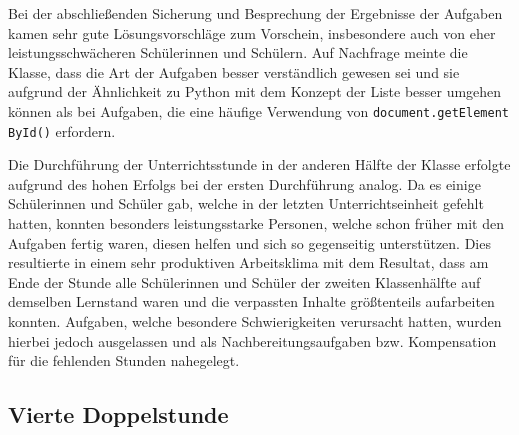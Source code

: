 Bei der abschließenden Sicherung und Besprechung der Ergebnisse der Aufgaben kamen sehr gute Lösungsvorschläge zum Vorschein, insbesondere auch von eher leistungsschwächeren Schülerinnen und Schülern.
Auf Nachfrage meinte die Klasse, dass die Art der Aufgaben besser verständlich gewesen sei und sie aufgrund der Ähnlichkeit zu Python mit dem Konzept der Liste besser umgehen können als bei Aufgaben, die eine häufige Verwendung von \texttt{document.getElement} \texttt{ById()} erfordern.

Die Durchführung der Unterrichtsstunde in der anderen Hälfte der Klasse erfolgte aufgrund des hohen Erfolgs bei der ersten Durchführung analog.
Da es einige Schülerinnen und Schüler gab, welche in der letzten Unterrichtseinheit gefehlt hatten, konnten besonders leistungsstarke Personen, welche schon früher mit den Aufgaben fertig waren, diesen helfen und sich so gegenseitig unterstützen.
Dies resultierte in einem sehr produktiven Arbeitsklima mit dem Resultat, dass am Ende der Stunde alle Schülerinnen und Schüler der zweiten Klassenhälfte auf demselben Lernstand waren und die verpassten Inhalte größtenteils aufarbeiten konnten.
Aufgaben, welche besondere Schwierigkeiten verursacht hatten, wurden hierbei jedoch ausgelassen und als Nachbereitungsaufgaben bzw. Kompensation für die fehlenden Stunden nahegelegt.


\subsection{Vierte Doppelstunde}
\label{subsec:doppelstunde-4}
